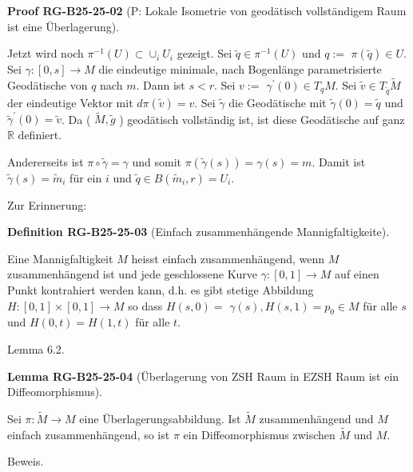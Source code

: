 \documentclass[10pt, letterpaper]{article}
\newcommand{\CustomHeading}[3]{%
  \par\medskip\noindent%
  \textbf{#1 #2} \textnormal{(#3)}.\enskip%
}
\newenvironment{DEF}[2]{\begin{unitbox}\CustomHeading{Definition}{#1}{#2}}{\end{unitbox}}
\newenvironment{LEM}[2]{\begin{unitbox}\CustomHeading{Lemma}{#1}{#2}}{\end{unitbox}}
\newenvironment{PROOF}[2]{\begin{unitbox}\CustomHeading{Proof}{#1}{#2}}{\end{unitbox}}
\begin{document}
\begin{PROOF}{RG-B25-25-02}{P: Lokale Isometrie von geodätisch vollständigem Raum ist eine Überlagerung}
Jetzt wird noch $\pi^{-1}(U) \subset \cup_{i} U_{i}$ gezeigt. Sei $\tilde{q} \in \pi^{-1}(U)$ und $q:=$ $\pi(\tilde{q}) \in U$. Sei $\gamma:[0, s] \rightarrow M$ die eindeutige minimale, nach Bogenlänge parametrisierte Geodätische von $q$ nach $m$. Dann ist $s<r$. Sei $v:=$ $\gamma^{\prime}(0) \in T_{q} M$. Sei $\tilde{v} \in T_{\tilde{q}} \tilde{M}$ der eindeutige Vektor mit $d \pi(\tilde{v})=v$. Sei $\tilde{\gamma}$ die Geodätische mit $\tilde{\gamma}(0)=\tilde{q}$ und $\tilde{\gamma}^{\prime}(0)=\tilde{v}$. Da ( $\tilde{M}, \tilde{g}$ ) geodätisch vollständig ist, ist diese Geodätische auf ganz $\mathbb{R}$ definiert.

Andererseits ist $\pi \circ \tilde{\gamma}=\gamma$ und somit $\pi(\tilde{\gamma}(s))=\gamma(s)=m$. Damit ist $\tilde{\gamma}(s)=\tilde{m}_{i}$ für ein $i$ und $\tilde{q} \in B\left(\tilde{m}_{i}, r\right)=U_{i}$.
\end{PROOF}





Zur Erinnerung: 


\begin{DEF}{RG-B25-25-03}{Einfach zusammenhängende Mannigfaltigkeite}
Eine Mannigfaltigkeit $M$ heisst einfach zusammenhängend, wenn $M$ zusammenhängend ist und jede geschlossene Kurve $\gamma:[0,1] \rightarrow M$ auf einen Punkt kontrahiert werden kann, d.h. es gibt stetige Abbildung $H:[0,1] \times[0,1] \rightarrow M$ so dass $H(s, 0)=$ $\gamma(s), H(s, 1)=p_{0} \in M$ für alle $s$ und $H(0, t)=H(1, t)$ für alle $t$.
\end{DEF}

Lemma 6.2. 


\begin{LEM}{RG-B25-25-04}{Überlagerung von ZSH Raum in EZSH Raum ist ein Diffeomorphismus}
Sei $\pi: \tilde{M} \rightarrow M$ eine Überlagerungsabbildung. Ist $\tilde{M}$ zusammenhängend und $M$ einfach zusammenhängend, so ist $\pi$ ein Diffeomorphismus zwischen $\tilde{M}$ und $M$.
\end{LEM}

Beweis. 
\end{document}
